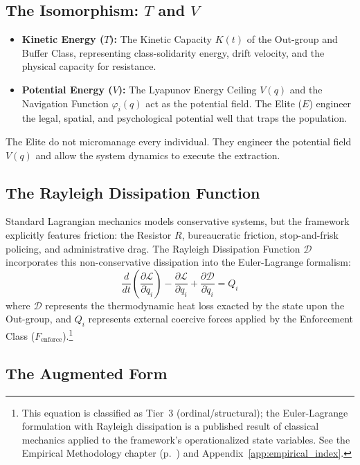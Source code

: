 \subsection{The Isomorphism: $T$ and $V$}

\begin{itemize}
    \item \textbf{Kinetic Energy ($T$):} The Kinetic Capacity $K(t)$ of the Out-group and Buffer Class, representing class-solidarity energy, drift velocity, and the physical capacity for resistance.
    \item \textbf{Potential Energy ($V$):} The Lyapunov Energy Ceiling $V(q)$ and the Navigation Function $\varphi_i(q)$ act as the potential field. The Elite ($E$) engineer the legal, spatial, and psychological potential well that traps the population.
\end{itemize}

The Elite do not micromanage every individual. They engineer the potential field $V(q)$ and allow the system dynamics to execute the extraction.

\subsection{The Rayleigh Dissipation Function}

Standard Lagrangian mechanics models conservative systems, but the framework explicitly features friction: the Resistor $R$, bureaucratic friction, stop-and-frisk policing, and administrative drag. The Rayleigh Dissipation Function $\mathcal{D}$ incorporates this non-conservative dissipation into the Euler-Lagrange formalism:
\begin{equation}\label{eq:lag-euler-lagrange}
\frac{d}{dt}\left(\frac{\partial \mathcal{L}}{\partial \dot{q}_i}\right) - \frac{\partial \mathcal{L}}{\partial q_i} + \frac{\partial \mathcal{D}}{\partial \dot{q}_i} = Q_i
\end{equation}
where $\mathcal{D}$ represents the thermodynamic heat loss exacted by the state upon the Out-group, and $Q_i$ represents external coercive forces applied by the Enforcement Class ($F_{\text{enforce}}$).\footnote{This equation is classified as Tier~3 (ordinal/structural); the Euler-Lagrange formulation with Rayleigh dissipation is a published result of classical mechanics applied to the framework's operationalized state variables. See the Empirical Methodology chapter (p.~\pageref{ch:empirical_methodology}) and Appendix~\ref{app:empirical_index}.}

\subsection{The Augmented Form}

